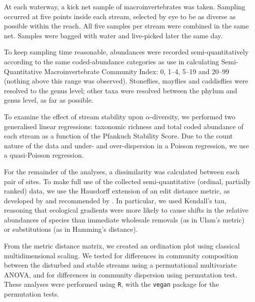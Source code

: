 \documentclass[a4paper,10pt]{article}
\begin{document}
At each waterway, a kick net sample of macroinvertebrates was taken.
Sampling occurred at five points inside each stream, selected by eye to be as diverse as possible within the reach.
All five samples per stream were combined in the same net.
Samples were bagged with water and live-picked later the same day.

To keep sampling time reasonable, abundances were recorded semi-quantitatively according to the same coded-abundance categories as use in calculating  Semi-Quantitative Macroinvertebrate Community Index:
0, 1--4, 5--19 and 20--99 (nothing above this range was observed).
Stoneflies, mayflies and caddisflies were resolved to the genus level; other taxa were resolved between the phylum and genus level, as far as possible.

To examine the effect of stream stability upon $\alpha$-diversity, we performed two generalised linear regressions: taxonomic richness and total coded abundance of each stream as a function of the Pfankuch Stability Score.
Due to the count nature of the data and under- and over-dispersion in a Poisson regression, we use a quasi-Poisson regression.

For the remainder of the analyses, a dissimilarity was calculated between each pair of sites.
To make full use of the collected semi-quantitative (ordinal, partially ranked) data, we use the Hausdorff extension of an edit distance metric, as developed by \textcite{critchlow} and recommended by \textcite{dissimilarity-partially-ranked}.
In particular, we used Kendall's tau, reasoning that ecological gradients were more likely to cause shifts in the relative abundances of species than immediate wholesale removals (as in Ulam's metric) or substitutions (as in Hamming's distance).

From the metric distance matrix, we created an ordination plot using classical multidimensional scaling.
We tested for differences in community composition between the disturbed and stable streams using a permutational multivariate ANOVA, and for differences in community dispersion using  permutation test.
These analyses were performed using \texttt{R}, with the \texttt{vegan} package \parencite{vegan} for the permutation tests.

\end{document}
